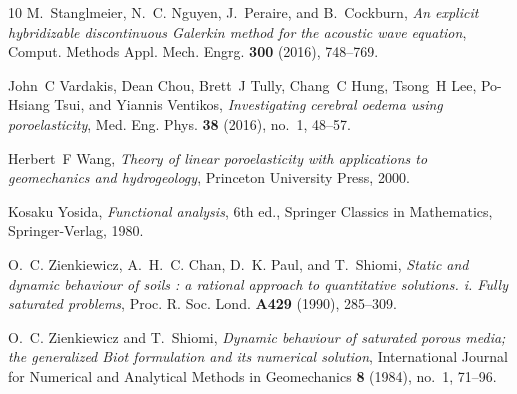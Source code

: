 \documentclass[10pt,letterpaper]{amsart}
\theoremstyle{plain} %
\theoremstyle{remark} %
\begin{document}
\begin{thebibliography}{10}
M.~Stanglmeier, N.~C. Nguyen, J.~Peraire, and B.~Cockburn, \emph{An explicit
  hybridizable discontinuous {G}alerkin method for the acoustic wave equation},
  Comput. Methods Appl. Mech. Engrg. \textbf{300} (2016), 748--769.

John~C Vardakis, Dean Chou, Brett~J Tully, Chang~C Hung, Tsong~H Lee, Po-Hsiang
  Tsui, and Yiannis Ventikos, \emph{Investigating cerebral oedema using
  poroelasticity}, Med. Eng. Phys. \textbf{38} (2016), no.~1, 48--57.

Herbert~F Wang, \emph{Theory of linear poroelasticity with applications to
  geomechanics and hydrogeology}, Princeton University Press, 2000.

Kosaku Yosida, \emph{Functional analysis}, 6th ed., Springer Classics in
  Mathematics, Springer-Verlag, 1980.

O.~C. Zienkiewicz, A.~H.~C. Chan, D.~K. Paul, and T.~Shiomi, \emph{Static and
  dynamic behaviour of soils : a rational approach to quantitative solutions.
  i. {F}ully saturated problems}, Proc. R. Soc. Lond. \textbf{A429} (1990),
  285--309.

O.~C. Zienkiewicz and T.~Shiomi, \emph{Dynamic behaviour of saturated porous
  media; the generalized {B}iot formulation and its numerical solution},
  International Journal for Numerical and Analytical Methods in Geomechanics
  \textbf{8} (1984), no.~1, 71--96.

\end{thebibliography}
\end{document}
